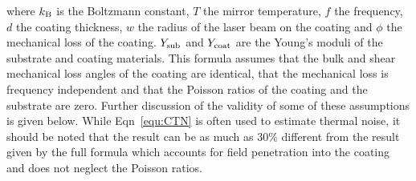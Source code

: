 \noindent where $k_{\rm B}$ is the Boltzmann constant, $T$ the mirror temperature, $f$ the frequency, $d$ the coating thickness, $w$ the radius of the laser beam on the coating and $\phi$ the mechanical loss of the coating. $Y_{\rm sub}$ and $Y_{\rm coat}$ are the Young's moduli of the substrate and coating materials. This formula assumes that the bulk and shear mechanical loss angles of the coating are identical, that the mechanical loss is frequency independent and that the Poisson ratios of the coating and the substrate are zero. Further discussion of the validity of some of these assumptions is given below. While Eqn~\ref{equ:CTN} is often used to estimate thermal noise, it should be noted that the result can be as much as 30$\%$ different from the result given by the full formula which accounts for field penetration into the coating and does not neglect the Poisson ratios.

